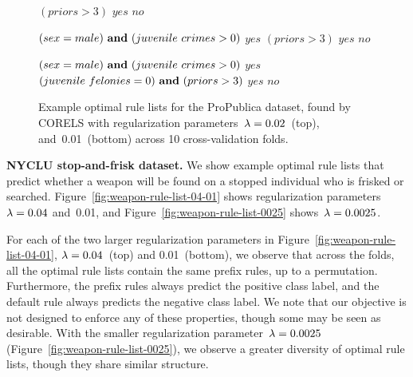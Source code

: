 \begin{figure}[h!]
\begin{algorithmic}
\State \belif $(priors > 3)$ \bthen $yes$
\State \belse $no$
\end{algorithmic}
\vspace{1mm}
\begin{algorithmic}
\State \bif $(sex = male) {\bf ~and~} (juvenile~crimes > 0)$ \bthen $yes$ 
\State \belif $(priors > 3)$ \bthen $yes$
\State \belse $no$
\end{algorithmic}
\vspace{1mm}
\begin{algorithmic}
\State \bif $(sex = male) {\bf ~and~} (juvenile~crimes > 0)$ \bthen $yes$ 
\State \belif $(juvenile~felonies = 0) {\bf ~and~} (priors > 3)$ \bthen $yes$
\State \belse $no$
\end{algorithmic}
\caption{Example optimal rule lists for the ProPublica dataset,
found by CORELS with regularization parameters~${{\lambda} = 0.02}$~(top),
and~0.01~(bottom) across 10 cross-validation folds.
}
\label{fig:recidivism-rule-list-02-01}
\end{figure}

\textbf{NYCLU stop-and-frisk dataset.}
We show example optimal rule lists that predict whether a weapon
will be found on a stopped individual who is frisked or searched.
%
Figure~\ref{fig:weapon-rule-list-04-01} shows
regularization parameters~${{\lambda} = 0.04}$ and~0.01,
and Figure~\ref{fig:weapon-rule-list-0025} shows~${{\lambda} = 0.0025}$.

For each of the two larger regularization parameters in Figure~\ref{fig:weapon-rule-list-04-01},
${{\lambda} = 0.04}$~(top) and 0.01~(bottom), we observe that across the folds,
all the optimal rule lists contain the same prefix rules, up to a permutation.
%
Furthermore, the prefix rules always predict the positive class label,
and the default rule always predicts the negative class label.
%
We note that our objective is not designed to enforce any of these properties,
though some may be seen as desirable.
%
With the smaller regularization parameter~${{\lambda} = 0.0025}$ (Figure~\ref{fig:weapon-rule-list-0025}), we observe a greater diversity
of optimal rule lists, though they share similar structure.

